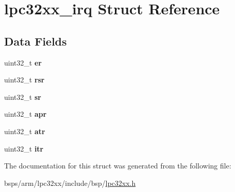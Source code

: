 \hypertarget{structlpc32xx__irq}{}\section{lpc32xx\+\_\+irq Struct Reference}
\label{structlpc32xx__irq}
\subsection*{Data Fields}
\begin{DoxyCompactItemize}
\item 
\mbox{\label{structlpc32xx__irq_ad76b0d754c0766488eb0fe37478fd455}} 
uint32\+\_\+t {\bfseries er}
\item 
\mbox{\label{structlpc32xx__irq_a7015d3442dee633040ee1001e17740f7}} 
uint32\+\_\+t {\bfseries rsr}
\item 
\mbox{\label{structlpc32xx__irq_adc1aa39d93747d8bbc82b9a939835805}} 
uint32\+\_\+t {\bfseries sr}
\item 
\mbox{\label{structlpc32xx__irq_ad29da9d75c020c63942a5fff80dcca72}} 
uint32\+\_\+t {\bfseries apr}
\item 
\mbox{\label{structlpc32xx__irq_a18fb37901167320220489540217ca020}} 
uint32\+\_\+t {\bfseries atr}
\item 
\mbox{\label{structlpc32xx__irq_a7fd6c154cccd71385e60d3629ac50683}} 
uint32\+\_\+t {\bfseries itr}
\end{DoxyCompactItemize}


The documentation for this struct was generated from the following file\+:\begin{DoxyCompactItemize}
\item 
bsps/arm/lpc32xx/include/bsp/\mbox{\hyperlink{lpc32xx_8h}{lpc32xx.\+h}}\end{DoxyCompactItemize}
